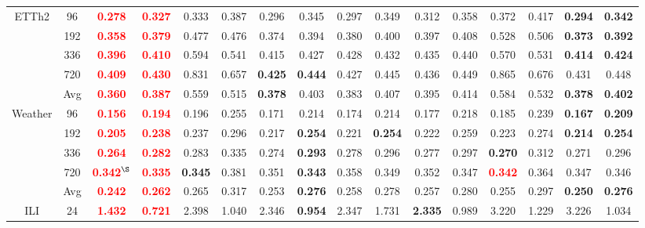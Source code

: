 \documentclass[a4paper,fleqn]{cas-sc}
\begin{document}
\begin{table}[t]
{\begin{tabular}{c|c|cc|cc|cc|cc|cc|cc|cc}
\midrule
\multirow{5}{*}{ETTh2}
& 96 & \textbf{\textcolor{red}{0.278}} & \textbf{\textcolor{red}{0.327}} & 0.333 & 0.387 & 0.296 & 0.345 & 0.297 & 0.349 & 0.312 & 0.358 & 0.372 & 0.417 & \textbf{0.294} & \textbf{0.342} \\
& 192 & \textbf{\textcolor{red}{0.358}} & \textbf{\textcolor{red}{0.379}} & 0.477 & 0.476 & 0.374 & 0.394 & 0.380 & 0.400 & 0.397 & 0.408 & 0.528 & 0.506 & \textbf{0.373} & \textbf{0.392} \\
& 336 & \textbf{\textcolor{red}{0.396}} & \textbf{\textcolor{red}{0.410}} & 0.594 & 0.541 & 0.415 & 0.427 & 0.428 & 0.432 & 0.435 & 0.440 & 0.570 & 0.531 & \textbf{0.414} & \textbf{0.424} \\
& 720 & \textbf{\textcolor{red}{0.409}} & \textbf{\textcolor{red}{0.430}} & 0.831 & 0.657 & \textbf{0.425} & \textbf{0.444} & 0.427 & 0.445 & 0.436 & 0.449 & 0.865 & 0.676 & 0.431 & 0.448 \\
& Avg & \textbf{\textcolor{red}{0.360}} & \textbf{\textcolor{red}{0.387}} & 0.559 & 0.515 & \textbf{0.378} & 0.403 & 0.383 & 0.407 & 0.395 & 0.414 & 0.584 & 0.532 & \textbf{0.378} & \textbf{0.402} \\
\midrule
\multirow{5}{*}{Weather}
& 96 & \textbf{\textcolor{red}{0.156}} & \textbf{\textcolor{red}{0.194}} & 0.196 & 0.255 & 0.171 & 0.214 & 0.174 & 0.214 & 0.177 & 0.218 & 0.185 & 0.239 & \textbf{0.167} & \textbf{0.209} \\
& 192 & \textbf{\textcolor{red}{0.205}} & \textbf{\textcolor{red}{0.238}} & 0.237 & 0.296 & 0.217 & \textbf{0.254} & 0.221 & \textbf{0.254} & 0.222 & 0.259 & 0.223 & 0.274 & \textbf{0.214} & \textbf{0.254} \\
& 336 & \textbf{\textcolor{red}{0.264}} & \textbf{\textcolor{red}{0.282}} & 0.283 & 0.335 & 0.274 & \textbf{0.293} & 0.278 & 0.296 & 0.277 & 0.297 & \textbf{0.270} & 0.312 & 0.271 & 0.296 \\
& 720 & \textbf{\textcolor{red}{0.342$^\S$}} & \textbf{\textcolor{red}{0.335}} & \textbf{0.345} & 0.381 & 0.351 & \textbf{0.343} & 0.358 & 0.349 & 0.352 & 0.347 & \textbf{\textcolor{red}{0.342}} & 0.364 & 0.347 & 0.346 \\
& Avg & \textbf{\textcolor{red}{0.242}} & \textbf{\textcolor{red}{0.262}} & 0.265 & 0.317 & 0.253 & \textbf{0.276} & 0.258 & 0.278 & 0.257 & 0.280 & 0.255 & 0.297 & \textbf{0.250} & \textbf{0.276} \\
\midrule
\multirow{5}{*}{ILI}
& 24 & \textbf{\textcolor{red}{1.432}} & \textbf{\textcolor{red}{0.721}} & 2.398 & 1.040 & 2.346 & \textbf{0.954} & 2.347 & 1.731 & \textbf{2.335} & 0.989 & 3.220 & 1.229 & 3.226 & 1.034 \\

\end{tabular}}
\end{table}
\end{document}
